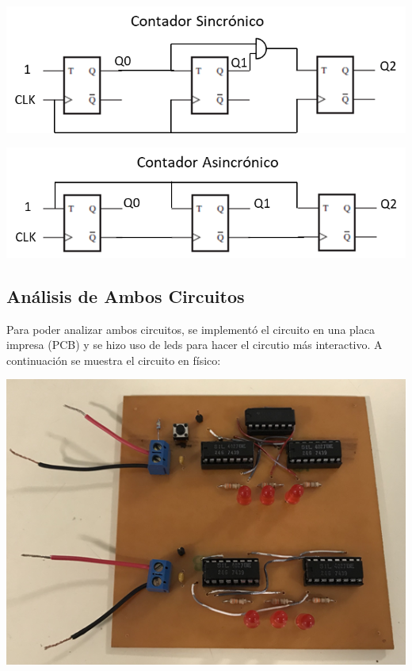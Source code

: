 \includegraphics{../7-Async-Sync-Counter/contador sinc.png}

\includegraphics{../7-Async-Sync-Counter/contador asinc.png}

\subsection{Análisis de Ambos Circuitos}

Para poder analizar ambos circuitos, se implementó el circuito en una placa impresa (PCB) y se hizo uso de leds para hacer el circutio más interactivo.
A continuación se muestra el circuito en físico:
\begin{center}
\includegraphics{../7-Async-Sync-Counter/pcb.png}
\end{center}